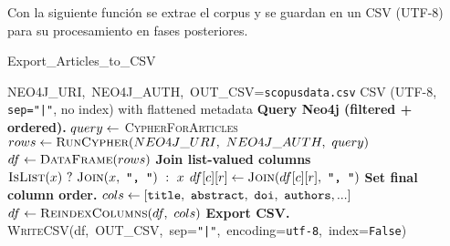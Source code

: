 Con la siguiente función se extrae el corpus y se guardan en un CSV (UTF-8) para su procesamiento en fases posteriores.
\begin{algorithmEN}
\caption{Export\_Articles\_to\_CSV}
\begin{algorithmic}[1]
\Require NEO4J\_URI,\ NEO4J\_AUTH,\ OUT\_CSV=\texttt{scopusdata.csv}
\Ensure  CSV (UTF-8, \texttt{sep="|"}, no index) with flattened metadata
\State \textbf{Query Neo4j (filtered + ordered).}
\State $query \leftarrow$ \textsc{CypherForArticles} 
\State $rows \Assign \textsc{RunCypher}(NEO4J\_URI,\ NEO4J\_AUTH,\ query)$
\State $df \leftarrow \textsc{DataFrame}(rows)$ 
\Statex \textbf{Join list-valued columns}
  \State \Return $\textsc{IsList}(x) \ ?\ \textsc{Join}(x,\ \texttt{", "})\ :\ x$
\EndFunction
{} 
        \State $df[c][r] \Assign \textsc{Join}(df[c][r],\ \texttt{", "})$
      \EndIf
    \EndFor
\EndFor
\Statex \textbf{Set final column order.}
\State $cols \Assign [\texttt{title},\ \texttt{abstract},\ \texttt{doi},\ \texttt{authors},...]$
\State $df \Assign \textsc{ReindexColumns}(df,\ cols)$
\Statex \textbf{Export CSV.}
\State \textsc{WriteCSV}(df,\ OUT\_CSV,\ sep=\texttt{"|"},\ encoding=\texttt{utf-8},\ index=\texttt{False})
\end{algorithmic}
\label{alg:export-articles-csv}
\end{algorithmEN}
